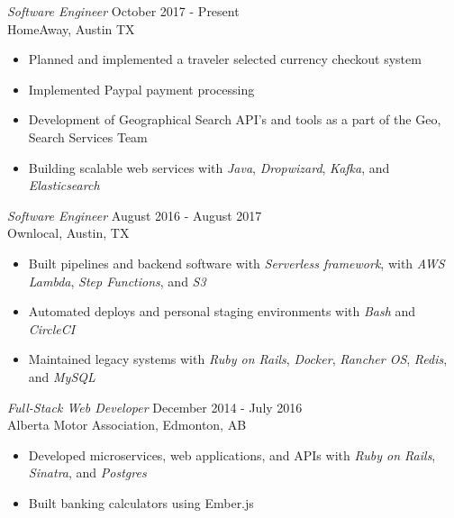 \documentclass[margin, 10pt]{res} %
\begin{document}
\begin{resume}
{\sl Software Engineer} \hfill October 2017 - Present \\
HomeAway, Austin TX
\begin{itemize}
    \item Planned and implemented a traveler selected currency checkout system
    \item Implemented Paypal payment processing
    \item Development of Geographical Search API's and tools as a part of the Geo, Search Services Team
    \item Building scalable web services with {\it Java}, {\it Dropwizard}, {\it Kafka}, and {\it Elasticsearch}
\end{itemize}


{\sl Software Engineer } \hfill August 2016 - August 2017 \\
Ownlocal, Austin, TX
\begin{itemize}
    \item Built pipelines and backend software with {\it Serverless framework}, with {\it AWS Lambda}, {\it Step Functions}, and {\it S3}
    \item Automated deploys and personal staging environments with {\it Bash} and {\it CircleCI}
    \item Maintained legacy systems with {\it Ruby on Rails}, {\it Docker}, {\it Rancher OS}, {\it Redis}, and {\it MySQL}
\end{itemize}

{\sl Full-Stack Web Developer} \hfill December 2014 - July 2016 \\
Alberta Motor Association, Edmonton, AB
\begin{itemize} 
    \item Developed microservices, web applications, and APIs with {\it Ruby on Rails}, {\it Sinatra}, and {\it Postgres}
    \item Built banking calculators using Ember.js
\end{itemize}


\end{resume}
\end{document}
